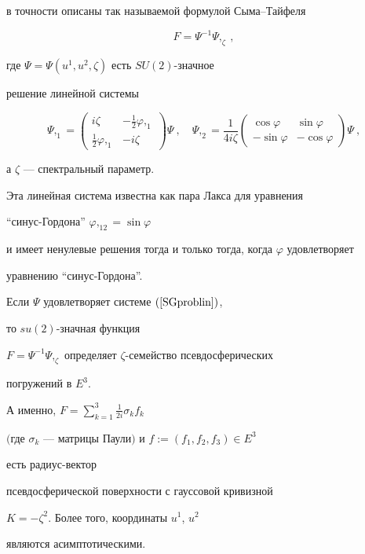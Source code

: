 в точности описаны так называемой формулой Сыма--Тайфеля


\begin{equation}


\label{Sym}


F = \Psi^{-1} \Psi,_\zeta \ ,


\end{equation}


где $\Psi=\Psi(u^1,u^2,\zeta)$ есть $SU(2)$-значное


решение линейной системы


\begin{equation}


\label{SGproblin}


\Psi,_1 = \begin{pmatrix} i\zeta & - \frac{1}{2} \varphi,_1 \\ \frac{1}{2} 


\varphi,_1 & - i \zeta \end{pmatrix} \Psi \ , \quad


\Psi,_2 = \frac{1}{4i\zeta} \begin{pmatrix} \cos\varphi & \sin\varphi \\ 


-\sin\varphi & -\cos\varphi \end{pmatrix} \Psi \ ,


\end{equation}


а $\zeta$ --- спектральный параметр.


Эта линейная система известна как пара Лакса для уравнения


``синус-Гордона'' $ \varphi,_{12} = \sin{\varphi}$


и имеет ненулевые решения тогда и только тогда, когда $\varphi$ удовлетворяет


уравнению ``синус-Гордона''. 





\begin{thm}


Если $\Psi$ удовлетворяет системе $\rf{SGproblin}$,


то $su(2)$-значная функция


$F=\Psi^{-1}\Psi,_{\zeta}$ определяет $\zeta$-семейство псевдосферических


погружений в $E^3$.


А именно, $F =\sum\limits_{k=1}^3 \frac{1}{2i} \sigma_k f_k$


$($где $\sigma_k$ --- матрицы Паули$)$ и $f:=(f_1,f_2,f_3)\in E^3$


есть радиус-вектор


псевдосферической поверхности с гауссовой кривизной 


$K=-\zeta^2$. Более того, координаты $u^1$, $u^2$


являются асимптотическими.


\end{thm}





